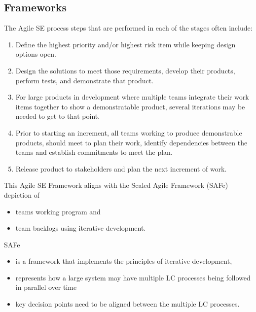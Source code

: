 \documentclass[letterpaper,10pt,english]{jupyterBook}
\begin{document}
\subsection{Frameworks}
\label{\detokenize{SE/sebok:frameworks}}
\sphinxAtStartPar
The Agile SE process steps that are performed in each of the stages often include:
\begin{enumerate}
%
\item {} 
\sphinxAtStartPar
Define the highest priority and/or highest risk item while keeping design options open.

\item {} 
\sphinxAtStartPar
Design the solutions to meet those requirements, develop their products, perform tests, and demonstrate that product.

\item {} 
\sphinxAtStartPar
For large products in development where multiple teams integrate their work items together to show a demonstratable product, several iterations may be needed to get to that point.

\item {} 
\sphinxAtStartPar
Prior to starting an increment, all teams working to produce demonstrable products, should meet to plan their work, identify dependencies between the teams and establish commitments to meet the plan.

\item {} 
\sphinxAtStartPar
Release product to stakeholders and plan the next increment of work.

\end{enumerate}

\sphinxAtStartPar
This Agile SE Framework aligns with the Scaled Agile Framework (SAFe) depiction of
\begin{itemize}
\item {} 
\sphinxAtStartPar
teams working program and

\item {} 
\sphinxAtStartPar
team backlogs using iterative development.

\end{itemize}

\sphinxAtStartPar
SAFe
\begin{itemize}
\item {} 
\sphinxAtStartPar
is a framework that implements the principles of iterative development,

\item {} 
\sphinxAtStartPar
represents how a large system may have multiple LC processes being followed in parallel over time

\item {} 
\sphinxAtStartPar
key decision points need to be aligned between the multiple LC processes.

\end{itemize}
\end{document}
